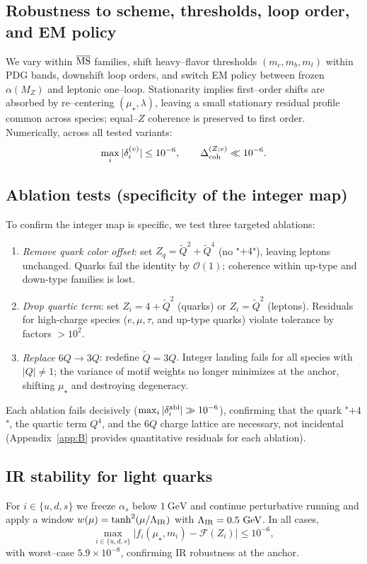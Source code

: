 \documentclass[aps,prd,onecolumn,amsmath,amssymb,superscriptaddress,nofootinbib,showpacs,showkeys]{revtex4-2}
\begin{document}
\subsection{Robustness to scheme, thresholds, loop order, and EM policy}
We vary within $\overline{\rm MS}$ families, shift heavy–flavor thresholds $(m_c,m_b,m_t)$ within PDG bands, downshift loop orders, and switch EM policy between frozen $\alpha(M_Z)$ and leptonic one–loop. Stationarity implies first–order shifts are absorbed by re–centering $(\mu_\star,\lambda)$, leaving a small stationary residual profile common across species; equal–$Z$ coherence is preserved to first order. Numerically, across all tested variants:
\[
\max_i|\delta_i^{(v)}|\le 10^{-6},\qquad \Delta_{\rm coh}^{(Z;v)}\ll 10^{-6}.
\]

\subsection{Ablation tests (specificity of the integer map)}
To confirm the integer map is specific, we test three targeted ablations:
\begin{enumerate}
  \item \emph{Remove quark color offset}: set $Z_q=\tilde Q^2+\tilde Q^4$ (no "$+4$"), leaving leptons unchanged. Quarks fail the identity by $\mathcal{O}(1)$; coherence within up-type and down-type families is lost.
  \item \emph{Drop quartic term}: set $Z_i=4+\tilde Q^2$ (quarks) or $Z_i=\tilde Q^2$ (leptons). Residuals for high-charge species ($e,\mu,\tau$, and up-type quarks) violate tolerance by factors $>10^2$.
  \item \emph{Replace $6Q\to3Q$}: redefine $\tilde Q=3Q$. Integer landing fails for all species with $|Q|\ne1$; the variance of motif weights no longer minimizes at the anchor, shifting $\mu_\star$ and destroying degeneracy.
\end{enumerate}
Each ablation fails decisively ($\max_i|\delta_i^{\rm abl}|\gg 10^{-6}$), confirming that the quark "$+4$", the quartic term $Q^4$, and the $6Q$ charge lattice are necessary, not incidental (Appendix~\ref{app:B} provides quantitative residuals for each ablation).

\subsection{IR stability for light quarks}
For $i\in\{u,d,s\}$ we  freeze $\alpha_s$ below $1~\mathrm{GeV}$ and  continue perturbative running
and  apply a window $w(\mu)=\tanh^2(\mu/\Lambda_{\rm IR})$ with $\Lambda_{\rm IR}=0.5~\mathrm{GeV}$. In all cases,
\[
\max_{i\in\{u,d,s\}}\bigl|f_i(\mu_\star,m_i)-\mathcal F(Z_i)\bigr|\le 10^{-6},
\]
with worst–case $5.9\times10^{-8}$, confirming IR robustness at the anchor.
\end{document}
